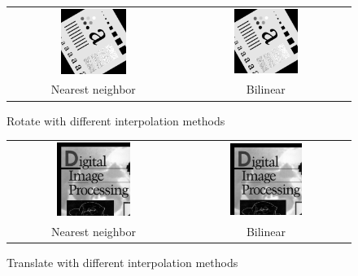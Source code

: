 \documentclass[11pt,a4paper]{article}
\begin{document}
\begin{figure}[!htbp]
	\centering
	\begin{tabular}{cc} 
		\includegraphics[width=0.4\textwidth]{pro6/rotate/rotate_nn}&
		\includegraphics[width=0.4\textwidth]{pro6/rotate/rotate_bilinear}\\
		Nearest neighbor &Bilinear 
	\end{tabular}
	\caption{Rotate with different interpolation methods}
	\label{pro6_fig3}
\end{figure}

\begin{figure}[!htbp]
	\centering
	\begin{tabular}{cc} 
		\includegraphics[width=0.45\textwidth]{pro6/translate/translate_nn}&
		\includegraphics[width=0.45\textwidth]{pro6/translate/translate_bilinear}\\
		Nearest neighbor &Bilinear 
	\end{tabular}
	\caption{Translate with different interpolation methods}
	\label{pro6_fig5}
\end{figure}
\end{document}
